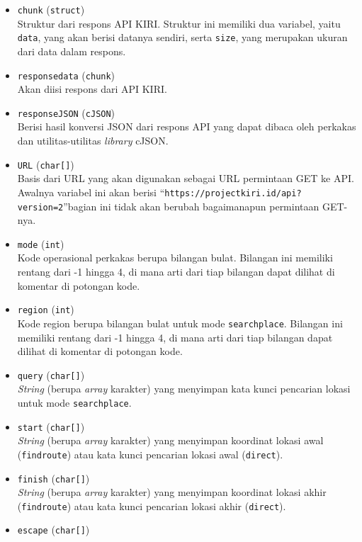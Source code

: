 \begin{itemize}[listparindent=\parindent]
	\begin{itemize}
		\item \verb|chunk| (\verb|struct|) \\
		Struktur dari respons API KIRI. Struktur ini memiliki dua variabel, yaitu \verb|data|, yang akan berisi datanya sendiri, serta \verb|size|, yang merupakan ukuran dari data dalam respons.
		\item \verb|responsedata| (\verb|chunk|) \\
		Akan diisi respons dari API KIRI.
		\item \verb|responseJSON| (\verb|cJSON|) \\
		Berisi hasil konversi JSON dari respons API yang dapat dibaca oleh perkakas dan utilitas-utilitas \textit{library} cJSON.
		\item \verb|URL| (\verb|char[]|) \\
		Basis dari URL yang akan digunakan sebagai URL permintaan GET ke API. Awalnya variabel ini akan berisi ``\verb|https://projectkiri.id/api?version=2|''\textemdash bagian ini tidak akan berubah bagaimanapun permintaan GET-nya.
		\item \verb|mode| (\verb|int|) \\
		Kode operasional perkakas berupa bilangan bulat. Bilangan ini memiliki rentang dari -1 hingga 4, di mana arti dari tiap bilangan dapat dilihat di komentar di potongan kode.
		\item \verb|region| (\verb|int|) \\
		Kode region berupa bilangan bulat untuk mode \verb|searchplace|. Bilangan ini memiliki rentang dari -1 hingga 4, di mana arti dari tiap bilangan dapat dilihat di komentar di potongan kode.
		\item \verb|query| (\verb|char[]|) \\
		\textit{String} (berupa \textit{array} karakter) yang menyimpan kata kunci pencarian lokasi untuk mode \verb|searchplace|.
		\item \verb|start| (\verb|char[]|) \\
		\textit{String} (berupa \textit{array} karakter) yang menyimpan koordinat lokasi awal (\verb|findroute|) atau kata kunci pencarian lokasi awal (\verb|direct|).
		\item \verb|finish| (\verb|char[]|) \\
		\textit{String} (berupa \textit{array} karakter) yang menyimpan koordinat lokasi akhir (\verb|findroute|) atau kata kunci pencarian lokasi akhir (\verb|direct|).
		\item \verb|escape| (\verb|char[]|) \\

\end{itemize}
\end{itemize}
